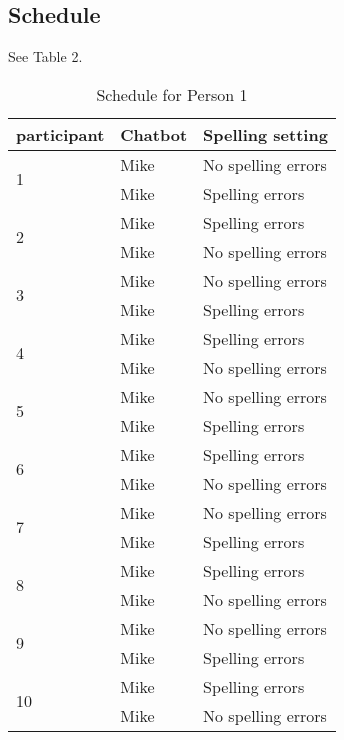 \subsection{Schedule}
See Table 2.
\begin{table}[!ht]
   \begin{center}
      \caption{Schedule for Person 1}
      \label{tabscheduleperson1}
      \vskip 0.12in
      \begin{tabular}[center]{| l | l | l |}
         \hline
         participant & Chatbot & Spelling setting \\
         \hline \hline
         \multirow{2}{*}{1}& Mike & No spelling errors \\
                           & Mike & Spelling errors \\
         \hline
         \multirow{2}{*}{2}& Mike & Spelling errors \\
                           & Mike & No spelling errors \\
         \hline
         \multirow{2}{*}{3}& Mike & No spelling errors \\
                           & Mike & Spelling errors \\
         \hline
         \multirow{2}{*}{4}& Mike & Spelling errors \\
                           & Mike & No spelling errors \\
         \hline
         \multirow{2}{*}{5}& Mike & No spelling errors \\
                           & Mike & Spelling errors \\
         \hline
         \multirow{2}{*}{6}& Mike & Spelling errors \\
                           & Mike & No spelling errors \\
         \hline
         \multirow{2}{*}{7}& Mike & No spelling errors \\
                           & Mike & Spelling errors \\
         \hline
         \multirow{2}{*}{8}& Mike & Spelling errors \\
                           & Mike & No spelling errors \\
         \hline
         \multirow{2}{*}{9}& Mike & No spelling errors \\
                           & Mike & Spelling errors \\
         \hline
         \multirow{2}{*}{10} & Mike & Spelling errors \\
                             & Mike & No spelling errors \\

\end{tabular}
\end{center}
\end{table}
